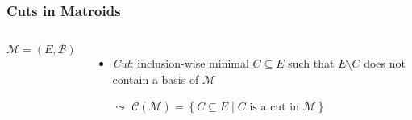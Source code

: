 \documentclass{beamer}
\newcommand{\tupel}[1]{\left(#1\right)}
\newcommand{\set}[1]{\left\{#1\right\}}
\begin{document}
\begin{frame}
  \frametitle{Cuts in Matroids}
  \begin{columns}
    $\mathcal{M} = \tupel{E, \mathcal{B}}$
    \begin{itemize}
      \item \emph{Cut}: inclusion-wise minimal $C\subseteq E$ such that
        $E\setminus C$ does not contain a basis of $\mathcal{M}$
      \item[$\leadsto$] $\mathcal{C}\tupel{\mathcal{M}} =
        \set{C\subseteq E\middle| C\text{ is a cut in } \mathcal{M}}$
    \end{itemize}
    \resizebox{0.8\textwidth}{!}{}
  \end{columns}
  \vspace{0.7cm}
  \begin{columns}
    \\[0.3cm]
  \end{columns}
\end{frame}
\end{document}
